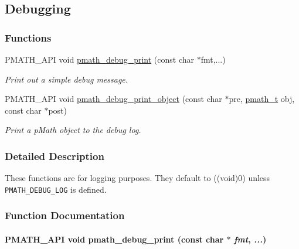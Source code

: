 \hypertarget{group__debug}{
\subsection{Debugging}
\label{group__debug}
}
\subsubsection*{Functions}
\begin{CompactItemize}
\item 
PMATH\_\-API void \hyperlink{group__debug_gdc8dcb307ec9ead7a2064a19c8f837cf}{pmath\_\-debug\_\-print} (const char $\ast$fmt,...)
\begin{CompactList}\small\item\em Print out a simple debug message. \item\end{CompactList}\item 
PMATH\_\-API void \hyperlink{group__debug_g05424b6252f7de0e25b31aa10328c64a}{pmath\_\-debug\_\-print\_\-object} (const char $\ast$pre, \hyperlink{classpmath__t}{pmath\_\-t} obj, const char $\ast$post)
\begin{CompactList}\small\item\em Print a pMath object to the debug log. \item\end{CompactList}\end{CompactItemize}


\subsubsection{Detailed Description}
These functions are for logging purposes. They default to ((void)0) unless {\tt PMATH\_\-DEBUG\_\-LOG} is defined. 

\subsubsection{Function Documentation}
\hypertarget{group__debug_gdc8dcb307ec9ead7a2064a19c8f837cf}{
\paragraph[{pmath\_\-debug\_\-print}]{\setlength{\rightskip}{0pt plus 5cm}PMATH\_\-API void pmath\_\-debug\_\-print (const char $\ast$ {\em fmt}, \/   {\em ...})}\hfill}
\label{group__debug_gdc8dcb307ec9ead7a2064a19c8f837cf}


